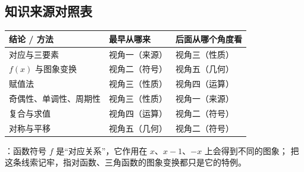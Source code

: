 \begin{afterclass}
\subsection{知识来源对照表}
\begin{center}
\footnotesize
\setlength{\tabcolsep}{4pt}
\renewcommand{\arraystretch}{1.35}
\begin{tabular}{p{3.4cm}p{4.0cm}p{5.6cm}}
\toprule
结论 / 方法 & 最早从哪来 & 后面从哪个角度看 \\
\midrule
对应与三要素 & 视角一（来源） & 视角三（性质） \\
$f(x)$ 与图象变换 & 视角二（符号） & 视角五（几何） \\
赋值法 & 视角三（性质） & 视角四（运算） \\
奇偶性、单调性、周期性 & 视角三（性质） & 视角一（来源） \\
复合与求值 & 视角四（运算） & 视角二（符号） \\
对称与平移 & 视角五（几何） & 视角二（符号） \\
\bottomrule
\end{tabular}
\end{center}

：函数符号 $f$ 是“对应关系”，它作用在 $x$、$x-1$、$-x$ 上会得到不同的图象；
把这条线索记牢，指对函数、三角函数的图象变换都只是它的特例。
\end{afterclass}
